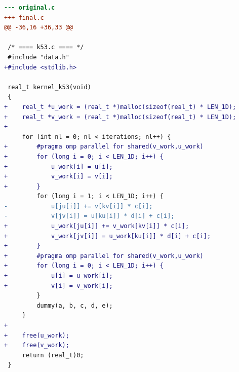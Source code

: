 \begin{lstlisting}[language=diff,basicstyle=\ttfamily\scriptsize,breaklines=true,caption={tsvc_c2/k53 — parallel-not-faster (e2v6_fb_3)}]
--- original.c
+++ final.c
@@ -36,16 +36,33 @@
 
 /* ==== k53.c ==== */
 #include "data.h"
+#include <stdlib.h>
 
 real_t kernel_k53(void)
 {
+    real_t *u_work = (real_t *)malloc(sizeof(real_t) * LEN_1D);
+    real_t *v_work = (real_t *)malloc(sizeof(real_t) * LEN_1D);
+
     for (int nl = 0; nl < iterations; nl++) {
+        #pragma omp parallel for shared(v_work,u_work) 
+        for (long i = 0; i < LEN_1D; i++) {
+            u_work[i] = u[i];
+            v_work[i] = v[i];
+        }
         for (long i = 1; i < LEN_1D; i++) {
-            u[ju[i]] += v[kv[i]] * c[i];
-            v[jv[i]] = u[ku[i]] * d[i] + c[i];
+            u_work[ju[i]] += v_work[kv[i]] * c[i];
+            v_work[jv[i]] = u_work[ku[i]] * d[i] + c[i];
+        }
+        #pragma omp parallel for shared(v_work,u_work) 
+        for (long i = 0; i < LEN_1D; i++) {
+            u[i] = u_work[i];
+            v[i] = v_work[i];
         }
         dummy(a, b, c, d, e);
     }
+
+    free(u_work);
+    free(v_work);
     return (real_t)0;
 }
 
\end{lstlisting}
